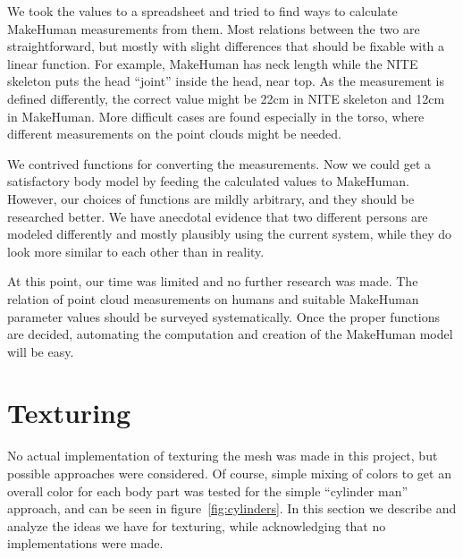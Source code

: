 We took the values to a spreadsheet and tried to find ways to calculate MakeHuman measurements from them. Most relations between the two are straightforward, but mostly with slight differences that should be fixable with a linear function. For example, MakeHuman has neck length while the NITE skeleton puts the head ``joint'' inside the head, near top. As the measurement is defined differently, the correct value might be 22cm in NITE skeleton and 12cm in MakeHuman. More difficult cases are found especially in the torso, where different measurements on the point clouds might be needed.

We contrived functions for converting the measurements. Now we could get a satisfactory body model by feeding the calculated values to MakeHuman. However, our choices of functions are mildly arbitrary, and they should be researched better. We have anecdotal evidence that two different persons are modeled differently and mostly plausibly using the current system, while they do look more similar to each other than in reality.

At this point, our time was limited and no further research was made. The relation of point cloud measurements on humans and suitable MakeHuman parameter values should be surveyed systematically. Once the proper functions are decided, automating the computation and creation of the MakeHuman model will be easy.


\section{Texturing} \label{approach.texturing}

No actual implementation of texturing the mesh was made in this project, but possible approaches were considered. Of course, simple mixing of colors to get an overall color for each body part was tested for the simple ``cylinder man'' approach, and can be seen in figure~\ref{fig:cylinders}. In this section we describe and analyze the ideas we have for texturing, while acknowledging that no implementations were made.

